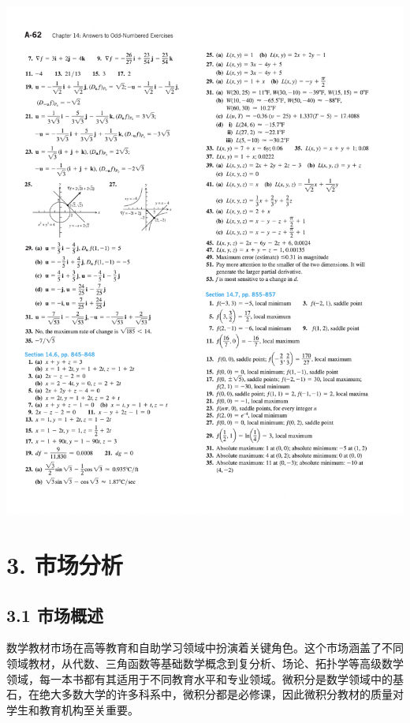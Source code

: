 \documentclass{report}
\begin{document}
\begin{center}
    \includegraphics[width=\textwidth]{./content3.png}
\end{center}

\newpage

\section*{3. 市场分析}

\subsection*{3.1 市场概述}

数学教材市场在高等教育和自助学习领域中扮演着关键角色。这个市场涵盖了不同领域教材，从代数、三角函数等基础数学概念到复分析、场论、拓扑学等高级数学领域，每一本书都有其适用于不同教育水平和专业领域。微积分是数学领域中的基石，在绝大多数大学的许多科系中，微积分都是必修课，因此微积分教材的质量对学生和教育机构至关重要。
\end{document}
